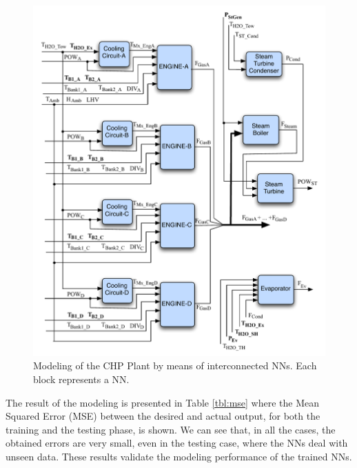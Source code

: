 \begin{figure}
\includegraphics[width=1\textwidth]{NNs.pdf}
\caption{Modeling of the CHP Plant by means of interconnected NNs. Each block represents a NN.}
\label{fignns}
\end{figure}


The result of the modeling is presented in Table \ref{tbl:mse} where the Mean Squared Error (MSE) between the desired and actual output, for both the training and the testing phase, is shown. We can see that, in all the cases, the obtained  errors are very small, even in the testing case, where the NNs deal with unseen data. These results validate the modeling performance of the trained NNs. 

